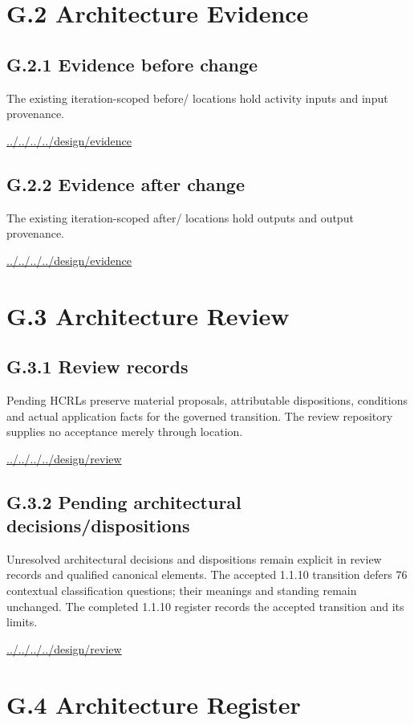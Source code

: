 \documentclass[10pt,a4paper]{article}
\begin{document}
\section*{G.2 Architecture Evidence}
\subsection*{G.2.1 Evidence before change}
The existing iteration-scoped before/ locations hold activity inputs and input provenance.\par
{\footnotesize\url{../../../../design/evidence}}\par
\subsection*{G.2.2 Evidence after change}
The existing iteration-scoped after/ locations hold outputs and output provenance.\par
{\footnotesize\url{../../../../design/evidence}}\par
\section*{G.3 Architecture Review}
\subsection*{G.3.1 Review records}
Pending HCRLs preserve material proposals, attributable dispositions, conditions and actual application facts for the governed transition. The review repository supplies no acceptance merely through location.\par
{\footnotesize\url{../../../../design/review}}\par
\subsection*{G.3.2 Pending architectural decisions/dispositions}
Unresolved architectural decisions and dispositions remain explicit in review records and qualified canonical elements. The accepted 1.1.10 transition defers 76 contextual classification questions; their meanings and standing remain unchanged. The completed 1.1.10 register records the accepted transition and its limits.\par
{\footnotesize\url{../../../../design/review}}\par
\section*{G.4 Architecture Register}
\end{document}
